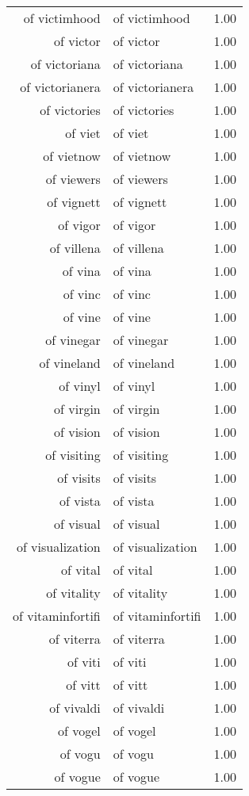 \begin{table}[ht]
\begin{tabular}{rlr}
  of victimhood & of victimhood & 1.00 \\ 
  of victor & of victor & 1.00 \\ 
  of victoriana & of victoriana & 1.00 \\ 
  of victorianera & of victorianera & 1.00 \\ 
  of victories & of victories & 1.00 \\ 
  of viet & of viet & 1.00 \\ 
  of vietnow & of vietnow & 1.00 \\ 
  of viewers & of viewers & 1.00 \\ 
  of vignett & of vignett & 1.00 \\ 
  of vigor & of vigor & 1.00 \\ 
  of villena & of villena & 1.00 \\ 
  of vina & of vina & 1.00 \\ 
  of vinc & of vinc & 1.00 \\ 
  of vine & of vine & 1.00 \\ 
  of vinegar & of vinegar & 1.00 \\ 
  of vineland & of vineland & 1.00 \\ 
  of vinyl & of vinyl & 1.00 \\ 
  of virgin & of virgin & 1.00 \\ 
  of vision & of vision & 1.00 \\ 
  of visiting & of visiting & 1.00 \\ 
  of visits & of visits & 1.00 \\ 
  of vista & of vista & 1.00 \\ 
  of visual & of visual & 1.00 \\ 
  of visualization & of visualization & 1.00 \\ 
  of vital & of vital & 1.00 \\ 
  of vitality & of vitality & 1.00 \\ 
  of vitaminfortifi & of vitaminfortifi & 1.00 \\ 
  of viterra & of viterra & 1.00 \\ 
  of viti & of viti & 1.00 \\ 
  of vitt & of vitt & 1.00 \\ 
  of vivaldi & of vivaldi & 1.00 \\ 
  of vogel & of vogel & 1.00 \\ 
  of vogu & of vogu & 1.00 \\ 
  of vogue & of vogue & 1.00 \\ 

\end{tabular}
\end{table}
